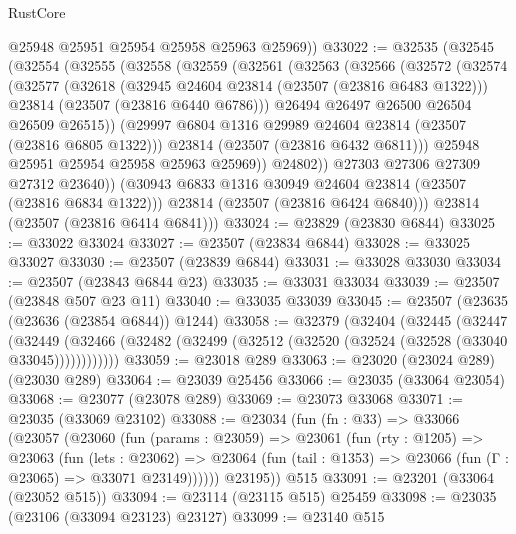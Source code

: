\begin{lexlean}{RustCore}
\begin{coremodule}
        @25948
        @25951
        @25954
        @25958
        @25963
        @25969))
@33022 := @32535
    (@32545
      (@32554
        (@32555
          (@32558
            (@32559
              (@32561
                (@32563
                  (@32566
                    (@32572
                      (@32574
                        (@32577
                          (@32618
                            (@32945 @24604 @23814 (@23507 (@23816 @6483 @1322)))
                            @23814
                            (@23507 (@23816 @6440 @6786)))
                          @26494
                          @26497
                          @26500
                          @26504
                          @26509
                          @26515))
                      (@29997 @6804 @1316 @29989 @24604 @23814 (@23507 (@23816 @6805 @1322)))
                      @23814
                      (@23507 (@23816 @6432 @6811)))
                    @25948
                    @25951
                    @25954
                    @25958
                    @25963
                    @25969))
                @24802))
            @27303
            @27306
            @27309
            @27312
            @23640))
        (@30943 @6833 @1316 @30949 @24604 @23814 (@23507 (@23816 @6834 @1322)))
        @23814
        (@23507 (@23816 @6424 @6840)))
      @23814
      (@23507 (@23816 @6414 @6841)))
@33024 := @23829 (@23830 @6844)
@33025 := @33022 @33024
@33027 := @23507 (@23834 @6844)
@33028 := @33025 @33027
@33030 := @23507 (@23839 @6844)
@33031 := @33028 @33030
@33034 := @23507 (@23843 @6844 @23)
@33035 := @33031 @33034
@33039 := @23507 (@23848 @507 @23 @11)
@33040 := @33035 @33039
@33045 := @23507 (@23635 (@23636 (@23854 @6844)) @1244)
@33058 := @32379
    (@32404
      (@32445
        (@32447
          (@32449 (@32466 (@32482 (@32499 (@32512 (@32520 (@32524 (@32528 (@33040 @33045))))))))))))
@33059 := @23018 @289
@33063 := @23020 (@23024 @289) (@23030 @289)
@33064 := @23039 @25456
@33066 := @23035 (@33064 @23054)
@33068 := @23077 (@23078 @289)
@33069 := @23073 @33068
@33071 := @23035 (@33069 @23102)
@33088 := @23034
    (fun (fn : @33) =>
    @33066
      (@23057
        (@23060
          (fun (params : @23059) =>
          @23061
            (fun (rty : @1205) =>
            @23063
              (fun (lets : @23062) =>
              @23064 (fun (tail : @1353) => @23066 (fun (Γ : @23065) => @33071 @23149))))))
        @23195))
    @515
@33091 := @23201 (@33064 (@23052 @515))
@33094 := @23114 (@23115 @515) @25459
@33098 := @23035 (@23106 (@33094 @23123) @23127)
@33099 := @23140 @515

\end{coremodule}
\end{lexlean}
